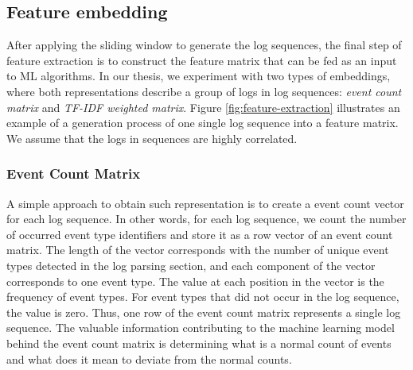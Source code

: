 \subsection{Feature embedding}
\label{subsection:features}
After applying the sliding window to generate the log sequences, the final step of feature extraction is to construct the feature matrix that can be fed as an input to ML algorithms. In our thesis, we experiment with two types of embeddings, where both representations describe a group of logs in log sequences: \textit{event count matrix} and \textit{TF-IDF weighted matrix}. Figure \ref{fig:feature-extraction} illustrates an example of a generation process of one single log sequence into a feature matrix. We assume that the logs in sequences are highly correlated.

\begin{figure}[!h] 
\end{figure}

\subsubsection*{Event Count Matrix}
A simple approach to obtain such representation is to create a event count vector for each log sequence. In other words, for each log sequence, we count the number of occurred event type identifiers and store it as a row vector of an event count matrix. The length of the vector corresponds with the number of unique event types detected in the log parsing section, and each component of the vector corresponds to one event type. The value at each position in the vector is the frequency of event types. For event types that did not occur in the log sequence, the value is zero. Thus, one row of the event count matrix represents a single log sequence. The valuable information contributing to the machine learning model behind the event count matrix is determining what is a normal count of events and what does it mean to deviate from the normal counts.


